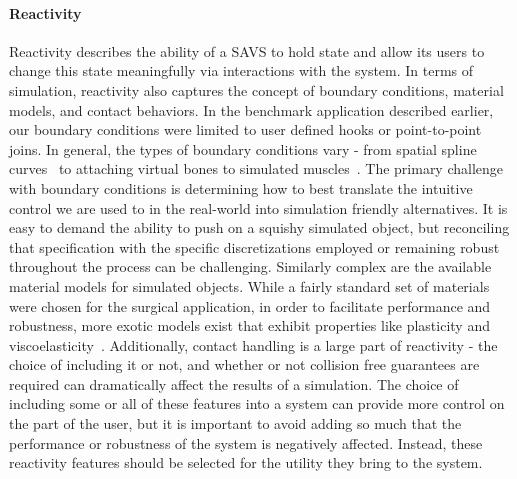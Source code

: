 \paragraph{Reactivity} Reactivity describes the ability of a SAVS to hold
  state and allow its users to change this state meaningfully via
  interactions with the system. In terms of simulation, reactivity
  also captures the concept of boundary conditions, material models,
  and contact behaviors. In the benchmark application described
  earlier, our boundary conditions were limited to user defined hooks
  or point-to-point joins. In general, the types of boundary
  conditions vary - from spatial spline curves~\citep{SetalWMKS:2014}
  to attaching virtual bones to simulated muscles~\citep{PatteMS:2012,MitchCS:2015}. The
  primary challenge with boundary conditions is determining how to
  best translate the intuitive control we are used to in the
  real-world into simulation friendly alternatives. It is easy to
  demand the ability to push on a squishy simulated object, but
  reconciling that specification with the specific discretizations
  employed or remaining robust throughout the process can be
  challenging. Similarly complex are the available material models for
  simulated objects. While a fairly standard set of materials were
  chosen for the surgical application, in order to facilitate
  performance and robustness, more exotic models exist that exhibit
  properties like plasticity and
  viscoelasticity~\citep{WojtaT:2008}. Additionally, contact handling
  is a large part of reactivity - the choice of including it or not,
  and whether or not collision free guarantees are required can
  dramatically affect the results of a simulation. The choice of
  including some or all of these features into a system can provide
  more control on the part of the user, but it is important to avoid
  adding so much that the performance or robustness of the system is
  negatively affected. Instead, these reactivity features should be
  selected for the utility they bring to the system.

  
